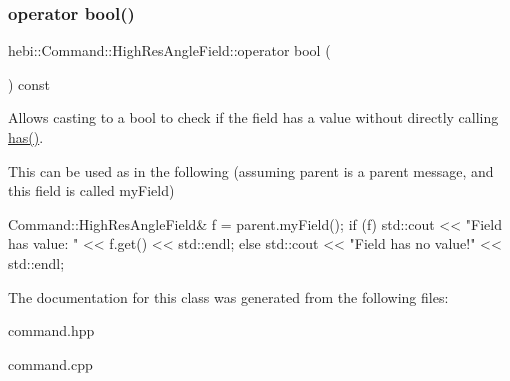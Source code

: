 \subsubsection{\texorpdfstring{operator bool()}{operator bool()}}
{\footnotesize\ttfamily hebi\+::\+Command\+::\+High\+Res\+Angle\+Field\+::operator bool (\begin{DoxyParamCaption}{ }\end{DoxyParamCaption}) const\hspace{0.3cm}{\ttfamily [explicit]}}



Allows casting to a bool to check if the field has a value without directly calling {\ttfamily \hyperlink{classhebi_1_1Command_1_1HighResAngleField_ae52c768ae24a84a181963dafa8f21d3b}{has()}}. 

This can be used as in the following (assuming \textquotesingle{}parent\textquotesingle{} is a parent message, and this field is called \textquotesingle{}my\+Field\textquotesingle{}) 
\begin{DoxyCode}
Command::HighResAngleField& f = parent.myField();
\textcolor{keywordflow}{if} (f)
  std::cout << \textcolor{stringliteral}{"Field has value: "} << f.get() << std::endl;
\textcolor{keywordflow}{else}
  std::cout << \textcolor{stringliteral}{"Field has no value!"} << std::endl;
\end{DoxyCode}
 

The documentation for this class was generated from the following files\+:\begin{DoxyCompactItemize}
\item 
command.\+hpp\item 
command.\+cpp\end{DoxyCompactItemize}

